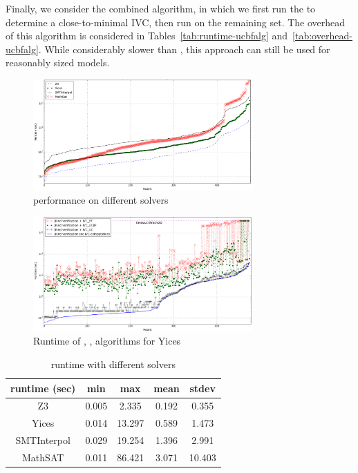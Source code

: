 Finally, we consider the combined \ucbfalg algorithm, in which we
first run the \ucalg to determine a close-to-minimal IVC, then run
\bfalg on the remaining set. The overhead of this algorithm is
considered in Tables~\ref{tab:runtime-ucbfalg}
and~\ref{tab:overhead-ucbfalg}. While considerably slower than \ucalg,
this approach can still be used for reasonably sized models.

\begin{figure}
  \centering
  \includegraphics[width=0.75\textwidth]{figs/performance.png}
  \vspace{-0.1in}
  \caption{\ucalg performance on different solvers}\label{fig:performance}
\end{figure}

\begin{figure}
  \centering
  \includegraphics[width=0.75\textwidth]{figs/timing_analyses.png}
  \vspace{-0.1in}
  \caption{Runtime of \bfalg, \ucbfalg, \ucalg algorithms for Yices}\label{fig:runtimeall}
\end{figure}

\begin{table}
  \centering
  \begin{tabular}{ |c||c|c|c|c| }
    \hline
     runtime (sec) & min & max & mean & stdev \\[0.5ex]
    \hline\hline
    Z3   & 0.005 & 2.335 & 0.192 & 0.355 \\[0.5ex]
    Yices &   0.014  & 13.297   & 0.589 & 1.473 \\[0.5ex]
    SMTInterpol& 0.029 & 19.254 &  1.396 & 2.991 \\[0.5ex]
    MathSAT & 0.011 & 86.421 &  3.071 & 10.403 \\[0.5ex]
    \hline
  \end{tabular} \\
  \caption{\ucalg runtime with different solvers}
  \label{tab:runtime-ucalg}
\end{table}

